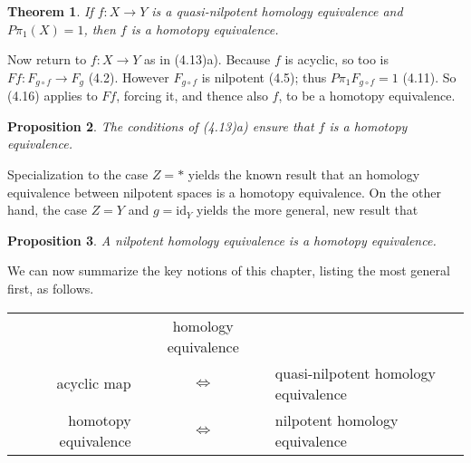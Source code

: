 \documentclass[openany,leqno]{book}  %
\newcommand{\id}{\mathrm{id}} %
\newtheorem{theorem}{Theorem}[chapter]
\newtheorem{prop}[theorem]{Proposition}
\begin{document}
\begin{theorem}
 	If $f\colon   X \longrightarrow Y$ is a quasi-nilpotent homology equivalence and $P\pi_1(X)=1$, then $f$ is a homotopy equivalence.
 \end{theorem} 

Now return to $f\colon   X \longrightarrow Y $ as in (4.13)a). Because $f$ is acyclic, so too is $Ff\colon   F_{g\circ f}\longrightarrow F_g$ (4.2).
However $F_{g\circ f}$ is nilpotent (4.5); thus $P\pi_1F_{g\circ f} = 1$ (4.11). So (4.16) applies to $Ff$, forcing it, and thence also $f$, to be a homotopy equivalence.

\begin{prop}
	The conditions of (4.13)a) ensure that $f$ is a homotopy equivalence.
\end{prop}
Specialization to the case $Z = *$ yields the known result that an homology equivalence between nilpotent spaces is a homotopy equivalence. On the other hand, the case $Z =Y$ and $g = \id_Y$ yields the more general, new result that

\begin{prop}
 	 A nilpotent homology equivalence is a homotopy equivalence.
 \end{prop}

We can now summarize the key notions of this chapter, listing the most general first, as follows.
\begin{tabular}{rcl}
 &homology equivalence& \\
 acyclic map &$\Longleftrightarrow $ &quasi-nilpotent homology equivalence \\
 homotopy equivalence &$\Longleftrightarrow $ &nilpotent homology equivalence
\end{tabular}
 
\end{document}
